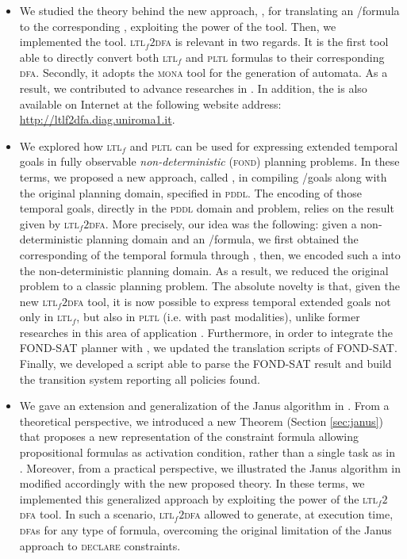 \begin{itemize}
\item We studied the theory behind the new approach, \LTLfToDFA, for translating an \LTLf/\PLTL formula to the corresponding \DFA, exploiting the power of the \MONA tool. Then, we implemented the \LTLfToDFA tool. \textsc{ltl}$_f2$\textsc{dfa} is relevant in two regards. It is the first tool able to directly convert both \textsc{ltl}$_f$ and \textsc{pltl} formulas to their corresponding \textsc{dfa}. Secondly, it adopts the \textsc{mona} tool for the generation of automata. As a result, we contributed to advance researches in \cite{zhu2017symbolic,zpv2018}. In addition, the \LTLfToDFA is also available on Internet at the following website address: \href{http://ltlf2dfa.diag.uniroma1.it}{http://ltlf2dfa.diag.uniroma1.it}.

\item We explored how \textsc{ltl}$_f$ and \textsc{pltl} can be used for expressing extended temporal goals in fully observable \textit{non-deterministic} (\textsc{fond}) planning problems. In these terms, we proposed a new approach, called \FONDFOR, in compiling \LTLf/\PLTL goals along with the original planning domain, specified in \textsc{pddl}.
The encoding of those temporal goals, directly in the \textsc{pddl} domain and problem, relies on the result given by \textsc{ltl}$_f2$\textsc{dfa}. More precisely, our idea was the following: given a non-deterministic planning domain and an \LTLf/\PLTL formula, we first obtained the corresponding \DFA of the temporal formula through \LTLfToDFA, then, we encoded such a \DFA into the non-deterministic planning domain. As a result, we reduced the original problem to a classic \FOND planning problem. The absolute novelty is that, given the new \textsc{ltl}$_f2$\textsc{dfa} tool, it is now possible to express temporal extended goals not only in \textsc{ltl}$_f$, but also in \textsc{pltl} (i.e. with past modalities), unlike  former researches in this area of application \citep{camacho2017non, camacho2018finite, camacho2018ltl}. Furthermore, in order to integrate the FOND-SAT planner with \FONDFOR, we updated the translation scripts of FOND-SAT. Finally, we developed a script able to parse the FOND-SAT result and build the transition system reporting all policies found.

\item We gave an extension and  generalization of the Janus algorithm in \cite{cecconi2018interestingness}. From a theoretical perspective, we introduced a new Theorem (Section \ref{sec:janus}) that proposes a new representation of the constraint formula allowing propositional formulas as activation condition, rather than a single task as in \cite{cecconi2018interestingness}. Moreover, from a practical perspective, we illustrated the Janus algorithm in \cite{cecconi2018interestingness} modified accordingly with the new proposed theory. In these terms, we implemented this generalized approach by exploiting the power of the \textsc{ltl}$_f2$\textsc{dfa} tool. In such a scenario, \textsc{ltl}$_f2$\textsc{dfa} allowed to generate, at execution time, \textsc{dfa}s for any type of formula, overcoming the original limitation of the Janus approach to \textsc{declare} constraints.
\end{itemize}


